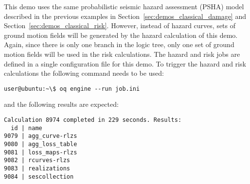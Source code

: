This demo uses the same probabilistic seismic hazard assessment (PSHA) model
described in the previous examples in Section~\ref{sec:demos_classical_damage}
and Section~\ref{sec:demos_classical_risk}. However, instead of hazard curves,
sets of ground motion fields will be generated by the hazard calculation of
this demo. Again, since there is only one branch in the logic tree, only one
set of ground motion fields will be used in the risk calculations. The hazard
and risk jobs are defined in a single configuration file for this demo. To
trigger the hazard and risk calculations the following command needs to be
used:

\begin{verbatim}
user@ubuntu:~\$ oq engine --run job.ini
\end{verbatim}

and the following results are expected:

\begin{verbatim}
Calculation 8974 completed in 229 seconds. Results:
  id | name
9079 | agg_curve-rlzs
9080 | agg_loss_table
9081 | loss_maps-rlzs
9082 | rcurves-rlzs
9083 | realizations
9084 | sescollection
\end{verbatim}
